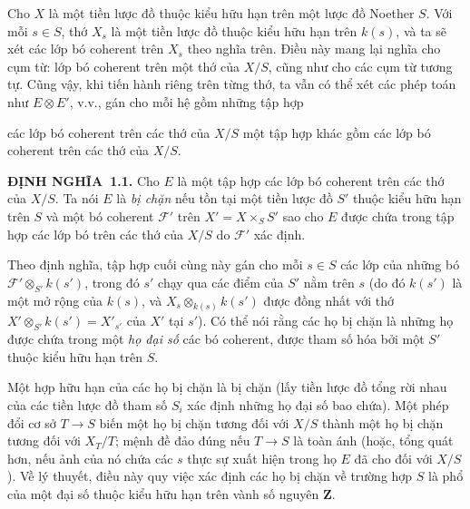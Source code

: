 \documentclass[11pt,twoside,openany]{book}
\numberwithin{equation}{section}
\newcommand{\src}[1]{%
  \phantomsection\hypertarget{src:\fgasourceid:#1}{}%
  \marginpar{\raggedleft\footnotesize\sffamily #1}%
}
\newcommand{\fgasourceid}{unset}
\newcommand{\result}[2]{\par\medskip\noindent\textbf{#1\if\relax\detokenize{#2}\relax\else\ #2\fi.}\quad}
\begin{document}
Cho $X$ là một tiền lược đồ thuộc kiểu hữu hạn trên một lược đồ Noether $S$.
Với mỗi $s\in S$, thớ $X_s$ là một tiền lược đồ thuộc kiểu hữu hạn trên
$k(s)$, và ta sẽ xét các lớp bó coherent trên $X_s$ theo nghĩa trên. Điều này
mang lại nghĩa cho cụm từ: lớp bó coherent trên một thớ của $X/S$, cũng như
cho các cụm từ tương tự. Cũng vậy, khi tiến hành riêng trên từng thớ, ta vẫn có
thể xét các phép toán như $E\otimes E'$, v.v., gán cho mỗi hệ gồm những tập hợp
\src{251}
các lớp bó coherent trên các thớ của $X/S$ một tập hợp khác gồm các lớp bó
coherent trên các thớ của $X/S$.

\result{ĐỊNH NGHĨA}{1.1} Cho $E$ là một tập hợp các lớp bó coherent trên các
thớ của $X/S$. Ta nói $E$ là \emph{bị chặn} nếu tồn tại một tiền lược đồ $S'$
thuộc kiểu hữu hạn trên $S$ và một bó coherent $\mathcal F'$ trên
$X'=X\times_S S'$ sao cho $E$ được chứa trong tập hợp các lớp bó trên các thớ
của $X/S$ do $\mathcal F'$ xác định.

Theo định nghĩa, tập hợp cuối cùng này gán cho mỗi $s\in S$ các lớp của những bó
$\mathcal F'\otimes_{S'}k(s')$, trong đó $s'$ chạy qua các điểm của $S'$ nằm
trên $s$ (do đó $k(s')$ là một mở rộng của $k(s)$, và
$X_s\otimes_{k(s)}k(s')$ được đồng nhất với thớ
$X'\otimes_{S'}k(s')=X'_{s'}$ của $X'$ tại $s'$). Có thể nói rằng các họ bị
chặn là những họ được chứa trong một \emph{họ đại số} các bó coherent, được
tham số hóa bởi một $S'$ thuộc kiểu hữu hạn trên $S$.

Một hợp hữu hạn của các họ bị chặn là bị chặn (lấy tiền lược đồ tổng rời nhau
của các tiền lược đồ tham số $S_i$ xác định những họ đại số bao chứa). Một phép
đổi cơ sở $T\longrightarrow S$ biến một họ bị chặn tương đối với $X/S$ thành
một họ bị chặn tương đối với $X_T/T$; mệnh đề đảo đúng nếu
$T\longrightarrow S$ là toàn ánh (hoặc, tổng quát hơn, nếu ảnh của nó chứa các
$s$ thực sự xuất hiện trong họ $E$ đã cho đối với $X/S$). Về lý thuyết, điều
này quy việc xác định các họ bị chặn về trường hợp $S$ là phổ của một đại số
thuộc kiểu hữu hạn trên vành số nguyên $\mathbf Z$.
\end{document}
